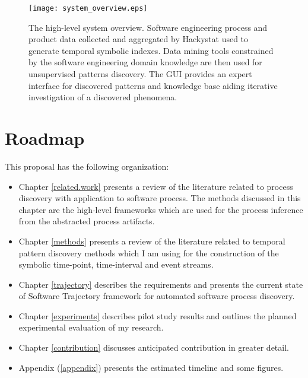 \begin{figure}[tbp]
   \centering
   \texttt{[image: system\_overview.eps]}
   \caption{The high-level system overview. Software engineering process and product data collected and aggregated by Hackystat used to generate temporal symbolic indexes. Data mining tools constrained by the software engineering domain knowledge are then used for unsupervised patterns discovery. The GUI provides an expert interface for discovered patterns and knowledge base aiding iterative investigation of a discovered phenomena.}
   \label{fig:system_overview}
\end{figure}

\section{Roadmap}
This proposal has the following organization:
\begin{itemize}
	\item Chapter \ref{related.work} presents a review of the literature related to process discovery with application to software process. The methods discussed in this chapter are the high-level frameworks which are used for the process inference from the abstracted process artifacts.
	\item Chapter \ref{methods} presents a review of the literature related to temporal pattern discovery methods which I am using for the construction of the symbolic time-point, time-interval and event streams.
	\item Chapter \ref{trajectory} describes the requirements and presents the current state of Software Trajectory framework for automated software process discovery.
	\item Chapter \ref{experiments} describes pilot study results and outlines the planned experimental evaluation of my research.
	\item Chapter \ref{contribution} discusses anticipated contribution in greater detail.
	\item Appendix (\ref{appendix}) presents the estimated timeline and some figures.
\end{itemize}
